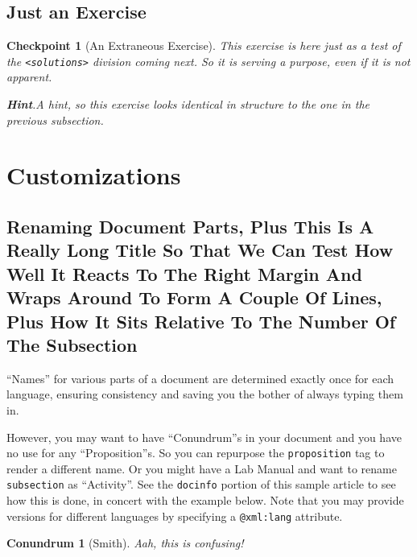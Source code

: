 \documentclass[pdflatex]{sn-jnl}
\theoremstyle{thmstyleone}%
\newtheorem{proposition}[theorem]{Conundrum}
\theoremstyle{thmstyletwo}%
\newtheorem{inlineexercise}[theorem]{Checkpoint}
\theoremstyle{thmstylethree}%
\newcommand{\blocktitlefont}{\relax}
\newcommand{\mono}[1]{\texttt{#1}}
\numberwithin{equation}{section}
\begin{document}
\subsection{Just an Exercise}\label{section-advanced-numbering-12}%
\begin{inlineexercise}[An Extraneous Exercise]\label{section-advanced-numbering-12-2}%
%
This exercise is here just as a test of the \mono{<solutions>} division coming next.  So it is serving a purpose, even if it is not apparent.%
\par\smallskip%
\noindent\textbf{\blocktitlefont Hint}.\hypertarget{section-advanced-numbering-12-2-3}{}\quad{}A hint, so this exercise looks identical in structure to the one in the previous subsection.%
\end{inlineexercise}%
%
%
\typeout{************************************************}
\typeout{************************************************}
%
\section{Customizations}\label{section-customizations}%
%
%
\typeout{************************************************}
\typeout{************************************************}
%
\subsection{Renaming Document Parts, Plus This Is A Really Long Title So That We Can Test How Well It Reacts To The Right Margin And Wraps Around To Form A Couple Of Lines, Plus How It Sits Relative To The Number Of The Subsection}\label{rename-facility}%
``Names'' for various parts of a document are determined exactly once for each language, ensuring consistency and saving you the bother of always typing them in.%
\par
However, you may want to have ``Conundrum''s in your document and you have no use for any ``Proposition''s.  So you can repurpose the \mono{proposition} tag to render a different name.  Or you might have a Lab Manual and want to rename \mono{subsection} as ``Activity''.  See the \mono{docinfo} portion of this sample article to see how this is done, in concert with the example below.  Note that you may provide versions for different languages by specifying a \mono{@xml:lang} attribute.%
\begin{proposition}[Smith]\label{proposition-as-conundrum}%
%
Aah, this \emph{is} confusing!%
\end{proposition}
\end{document}
